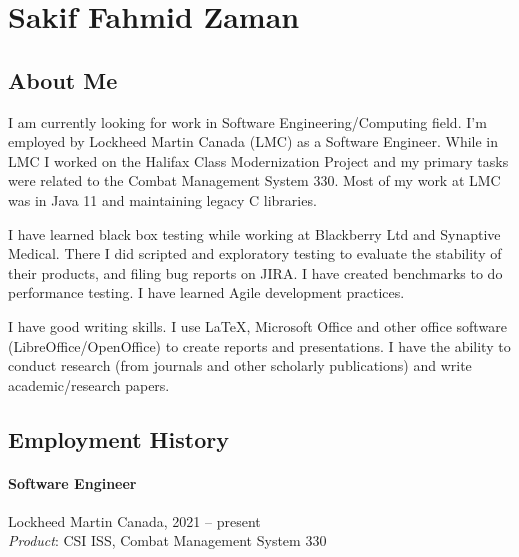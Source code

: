 \documentclass[10pt, twocolumn]{article}
\begin{document}
\section*{Sakif Fahmid Zaman}

\subsection*{About Me}
I am currently looking for work in Software Engineering/Computing field. I'm employed by Lockheed Martin Canada (LMC) as a Software Engineer. While in LMC I worked on the Halifax Class Modernization Project and my primary tasks were related to the Combat Management System 330. Most of my work at LMC was in Java 11 and maintaining legacy C libraries.



I have learned black box testing while working at Blackberry Ltd and Synaptive Medical. There I did scripted and exploratory testing to evaluate the stability of their products, and filing bug reports on JIRA. I have created benchmarks to do performance testing. I have learned Agile development practices.

I have good writing skills. I use LaTeX, Microsoft Office and other office software (LibreOffice/OpenOffice) to create reports and presentations. I have the ability to conduct research (from journals and other scholarly publications) and write academic/research papers.

\subsection*{Employment History}
\paragraph{Software Engineer} Lockheed Martin Canada, 2021 -- present\\
\emph{Product}: CSI ISS, Combat Management System 330
\end{document}
